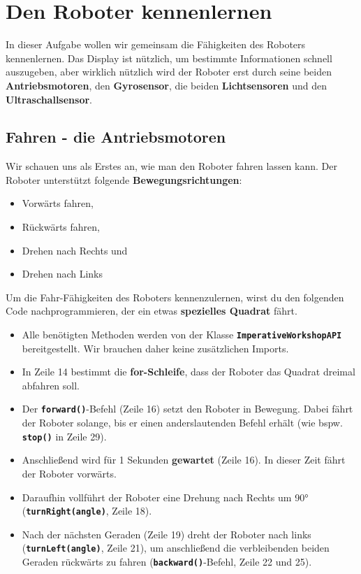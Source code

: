 \documentclass[
	12pt,
	colorbacktitle,
	accentcolor=tud1c,
	draft,
	twoside,
	german
]{tudexercise}
\newcommand{\solpath}[0]{../../impl/androidApp/app/src/main/java/org/mindroid/android/app/programs/workshop/solutions}
\newcommand{\bfcode}[1]{\texttt{\textbf{#1}}}
\begin{document}
	
	\section{Den Roboter kennenlernen}
	In dieser Aufgabe wollen wir gemeinsam die Fähigkeiten des Roboters kennenlernen. Das Display ist nützlich, um bestimmte Informationen schnell auszugeben, aber wirklich nützlich wird der Roboter erst durch seine beiden \textbf{Antriebsmotoren}, den \textbf{Gyrosensor}, die beiden \textbf{Lichtsensoren} und den \textbf{Ultraschallsensor}.
	
	\subsection{Fahren - die Antriebsmotoren}
	Wir schauen uns als Erstes an, wie man den Roboter fahren lassen kann. Der Roboter unterstützt folgende \textbf{Bewegungsrichtungen}:
	\begin{itemize}
	\item Vorwärts fahren,
	\item Rückwärts fahren,
	\item Drehen nach Rechts und
	\item Drehen nach Links
	\end{itemize}
	
	Um die Fahr-Fähigkeiten des Roboters kennenzulernen, wirst du den folgenden Code nachprogrammieren, der ein etwas \textbf{spezielles Quadrat} fährt.
	
	
	
	\begin{itemize}
	\setlength{\itemsep}{0pt}
	\item Alle benötigten Methoden werden von der Klasse \bfcode{ImperativeWorkshopAPI} bereitgestellt. Wir brauchen daher keine zusätzlichen Imports.
	\item In Zeile 14 bestimmt die \textbf{for-Schleife}, dass der Roboter das Quadrat dreimal abfahren soll.
	\item Der \bfcode{forward()}-Befehl (Zeile 16) setzt den Roboter in Bewegung. Dabei fährt der Roboter solange, bis er einen anderslautenden Befehl erhält (wie bspw. \bfcode{stop()} in Zeile 29).
	\item Anschließend wird für 1 Sekunden \textbf{gewartet} (Zeile 16). In dieser Zeit fährt der Roboter vorwärts.
	\item Daraufhin vollführt der Roboter eine Drehung nach Rechts um 90° (\bfcode{turnRight(angle)}, Zeile 18).
	\item Nach der nächsten Geraden (Zeile 19) dreht der Roboter nach links (\bfcode{turnLeft(angle)}, Zeile 21), um anschließend die verbleibenden beiden Geraden rückwärts zu fahren (\bfcode{backward()}-Befehl, Zeile 22 und 25).
	
	\end{itemize}
	
\end{document}

